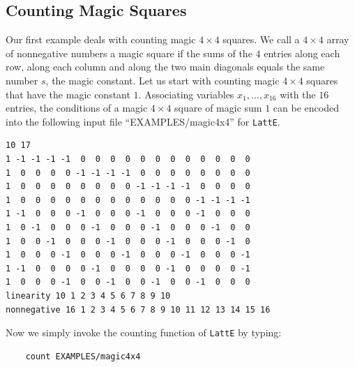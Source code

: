 \documentclass{article}
\begin{document}
\subsection{Counting Magic Squares}
Our first example deals with counting magic $4\times 4$ squares. We 
call a $4\times 4$ array of nonnegative numbers a magic square if the
sums of the $4$ entries along each row, along each column and along
the two main diagonals equals the same number $s$, the magic
constant. Let us start with counting magic $4\times 4$ squares that
have the magic constant $1$. Associating variables $x_1,\ldots,x_{16}$ with
the $16$ entries, the conditions of a magic $4\times 4$ square of
magic sum $1$ can be encoded into the following input file
``EXAMPLES/magic4x4'' for {\tt LattE}.
\begin{verbatim}
10 17
1 -1 -1 -1 -1  0  0  0  0  0  0  0  0  0  0  0  0
1  0  0  0  0 -1 -1 -1 -1  0  0  0  0  0  0  0  0
1  0  0  0  0  0  0  0  0 -1 -1 -1 -1  0  0  0  0
1  0  0  0  0  0  0  0  0  0  0  0  0 -1 -1 -1 -1
1 -1  0  0  0 -1  0  0  0 -1  0  0  0 -1  0  0  0
1  0 -1  0  0  0 -1  0  0  0 -1  0  0  0 -1  0  0
1  0  0 -1  0  0  0 -1  0  0  0 -1  0  0  0 -1  0
1  0  0  0 -1  0  0  0 -1  0  0  0 -1  0  0  0 -1
1 -1  0  0  0  0 -1  0  0  0  0 -1  0  0  0  0 -1
1  0  0  0 -1  0  0 -1  0  0 -1  0  0 -1  0  0  0
linearity 10 1 2 3 4 5 6 7 8 9 10
nonnegative 16 1 2 3 4 5 6 7 8 9 10 11 12 13 14 15 16
\end{verbatim}
Now we simply invoke the counting function of {\tt LattE} by typing:
\begin{verbatim}
    count EXAMPLES/magic4x4
\end{verbatim}
\end{document}
